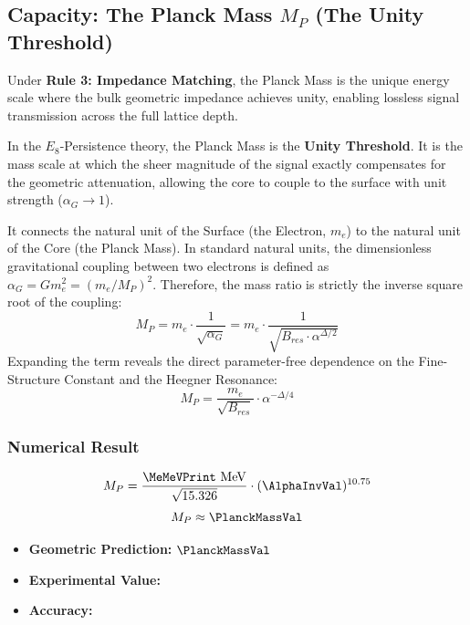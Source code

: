 \subsection{Capacity: The Planck Mass \texorpdfstring{$M_P$}{MP} (The Unity Threshold)}
Under \textbf{Rule 3: Impedance Matching}, the Planck Mass is the unique energy scale where the bulk geometric impedance achieves unity, enabling lossless signal transmission across the full lattice depth.

In the $E_8$-Persistence theory, the Planck Mass is the \textbf{Unity Threshold}. It is the mass scale at which the sheer magnitude of the signal exactly compensates for the geometric attenuation, allowing the core to couple to the surface with unit strength ($\alpha_G \to 1$).

It connects the natural unit of the Surface (the Electron, $m_e$) to the natural unit of the Core (the Planck Mass). In standard natural units, the dimensionless gravitational coupling between two electrons is defined as $\alpha_G = G m_e^2 = (m_e/M_P)^2$. Therefore, the mass ratio is strictly the inverse square root of the coupling:
\begin{equation}
M_P = m_e \cdot \frac{1}{\sqrt{\alpha_G}} = m_e \cdot \frac{1}{\sqrt{B_{res} \cdot \alpha^{\Delta/2}}}
\end{equation}
Expanding the term reveals the direct parameter-free dependence on the Fine-Structure Constant and the Heegner Resonance:
\begin{equation}
M_P = \frac{m_e}{\sqrt{B_{res}}} \cdot \alpha^{-\Delta/4}
\end{equation}

\subsubsection{Numerical Result}
\begin{equation}
M_P = \frac{\MeMeVPrint \text{ MeV}}{\sqrt{15.326}} \cdot (\AlphaInvVal)^{10.75}
\end{equation}
\begin{equation}
M_P \approx \mathbf{\PlanckMassVal}
\end{equation}
\begin{itemize}
    \item \textbf{Geometric Prediction:} $\PlanckMassVal$
    \item \textbf{Experimental Value:} \PlanckMassExperimentalValue
    \item \textbf{Accuracy:} \PlanckMassAccText
\end{itemize}


